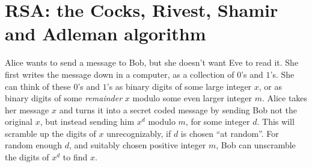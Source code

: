 \section{RSA: the Cocks, Rivest, Shamir and Adleman algorithm}
\begin{example}
Alice wants to send a message to Bob, but she doesn't want Eve to read it.
She first writes the message down in a computer, as a collection of \(0\)'s and \(1\)'s.
She can think of these \(0\)'s and \(1\)'s as binary digits of some large integer \(x\), or as binary digits of some \emph{remainder} \(x\) modulo some even larger integer \(m\).
Alice takes her message \(x\) and turns it into a secret coded message by sending Bob not the original \(x\), but instead sending him \(x^d\) modulo \(m\), for some integer \(d\).
This will scramble up the digits of \(x\) unrecognizably, if \(d\) is chosen ``at random''.
For random enough \(d\), and suitably chosen positive integer \(m\), Bob can unscramble the digits of \(x^d\) to find \(x\).
\end{example}

